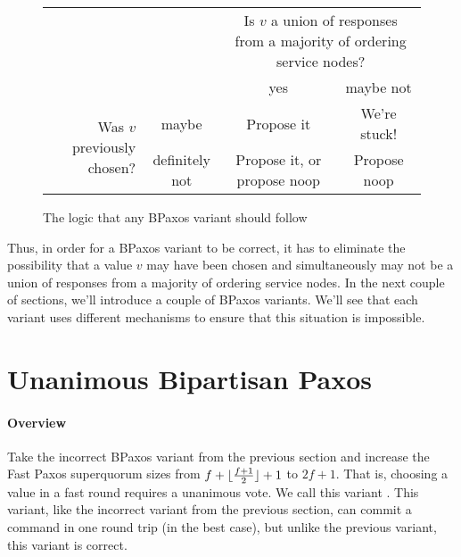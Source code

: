 \documentclass{mwhittaker}
\theoremstyle{definition}
\begin{document}
\begin{figure}[h]
  \centering
  \begin{tabular}{rccc}
    &
    &
    \multicolumn{2}{p{3in}}{%
      Is $v$ a union of responses from a majority of ordering service nodes?%
    } \\
    &
    &
    yes &
    maybe not \\\cline{3-4}
    \multirow{2}{1.8in}{Was $v$ previously chosen?} &
    maybe &
    \multicolumn{1}{|c|}{Propose it} &
    \multicolumn{1}{|c|}{We're stuck!} \\\cline{3-4}
    &
    definitely not &
    \multicolumn{1}{|c|}{Propose it, or propose noop} &
    \multicolumn{1}{|c|}{Propose noop} \\\cline{3-4}
  \end{tabular}
  \caption{The logic that any BPaxos variant should follow}%
\end{figure}

Thus, in order for a BPaxos variant to be correct, it has to eliminate the
possibility that a value $v$ may have been chosen and simultaneously may not be
a union of responses from a majority of ordering service nodes. In the next
couple of sections, we'll introduce a couple of BPaxos variants. We'll see that
each variant uses different mechanisms to ensure that this situation is
impossible.

\section{Unanimous Bipartisan Paxos}
\paragraph{Overview}
Take the incorrect BPaxos variant from the previous section and increase the
Fast Paxos superquorum sizes from $f + \lfloor\frac{f+1}{2}\rfloor + 1$ to $2f + 1$.
That is, choosing a value in a fast round requires a unanimous vote. We call
this variant . This variant, like the incorrect
variant from the previous section, can commit a command in one round trip (in
the best case), but unlike the previous variant, this variant is correct.
\end{document}

